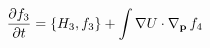 \documentclass[preview]{standalone}
\begin{document}
\begin{align*}
\special{dvisvgm:raw <g id='unique000'>}\pdv{f_3}{t}=\pb{H_3}{f_3}+\int\nabla U\cdot\nabla_{\va p}\, \special{dvisvgm:raw </g>}\special{dvisvgm:raw <g id='unique001'>}f_4\special{dvisvgm:raw </g>}
\end{align*}
\end{document}
